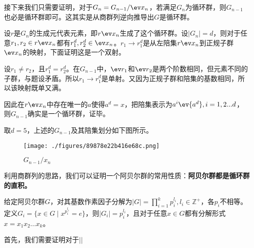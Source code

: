 接下来我们只需要证明，对于$G_{n}=G_{n-1}/\ev x_n$，若满足$G_{n}$为循环群，则$G_{n-1}$也必是循环群即可。这其实是从商群列逆向推导出$G$是循环群。

设$r$是$G_n$的生成元代表元素，即$r\ev x_n$生成了这个循环群。设$|G_{n}|=d$，则对于任意$r_1,r_2\in r\ev x_n$都有$r_1^d,r_2^d\in\ev x_n$。$r_1\rightarrow r_1^d$是从左陪集$r\ev x_n$到正规子群$\ev x_n$的映射，下面证明这是一个双射。

设$r_1\neq r_2$，且$r_1^d=r_2^d$。在$G_{n-1}$中，$\ev r_1$和$\ev r_2$是两个阶数相同，但元素不同的子群，与题设矛盾。所以$r_1\rightarrow r_1^d$是单射。又因为正规子群和陪集的基数相同，所以该映射既单又满。

因此在$r\ev x_n$中存在唯一的$a$使得$a^d=x$，把陪集表示为$a^i\ev {a^d},i=1,2...d$，则$G_{n-1}$确实是一个循环群，证毕。

取$d=5$，上述的$G_{n-1}$及其陪集划分如下图所示。
\begin{figure}[ht]
\centering
\texttt{[image: ./figures/89878e22b416e68c.png]}
\caption{$G_{n-1}/x_n$} \label{fig_cyclic_2}
\end{figure}
利用商群列的思路，我们可以证明一个阿贝尔群的常用性质：\textbf{阿贝尔群都是循环群的直积。
}
\begin{theorem}{}
给定阿贝尔群$G$，对其基数作素因子分解为$|G|=\prod_{i=1}^{k} p_{i}^{l_{i}},l_i\in\mathbb{Z}^+$，各$p_i$不相等。
定义$G_i = \{x \in G \mid x^{p_i^{l_i}} = e\}$，则$|G_i|=p_i^{l_i}$，且对于任意$x\in G$都有分解形式$x=x_1x_2...x_k$。
\end{theorem}
首先，我们需要证明对于$||$